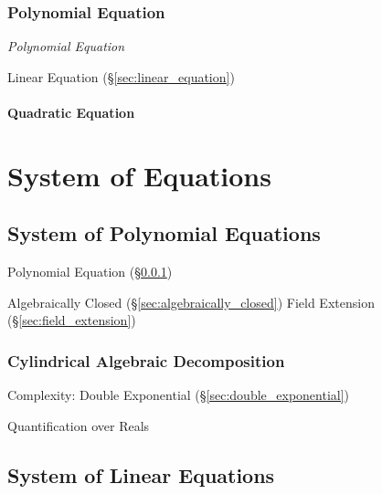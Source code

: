 \subsubsection{Polynomial Equation}\label{sec:polynomial_equation}

\emph{Polynomial Equation}

Linear Equation (\S\ref{sec:linear_equation})



\paragraph{Quadratic Equation}\label{sec:quadratic_equation}\hfill



\section{System of Equations}\label{sec:system_of_equations}

\subsection{System of Polynomial Equations}
\label{sec:system_of_polynomials}

Polynomial Equation (\S\ref{sec:polynomial_equation})

Algebraically Closed (\S\ref{sec:algebraically_closed}) Field
Extension (\S\ref{sec:field_extension})



\subsubsection{Cylindrical Algebraic Decomposition}
\label{sec:algebraic_decomposition}

Complexity: Double Exponential (\S\ref{sec:double_exponential})

Quantification over Reals



\subsection{System of Linear Equations}
\label{sec:system_of_linear_equations}

